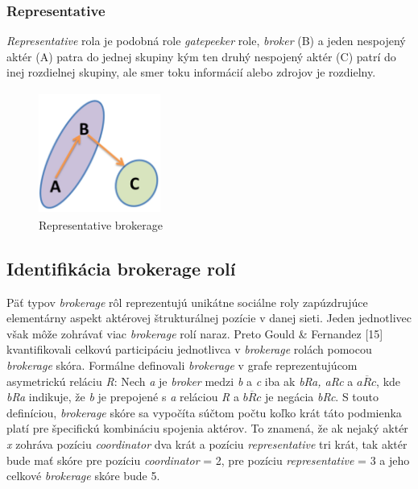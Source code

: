 \documentclass[slovak,master,public,dept460,male,cpdeclaration,oneside]{diploma}
\begin{document}
\subsubsection{Representative}
\textit{Representative} rola je podobná role \textit{gatepeeker} role, \textit{broker} (B) a jeden nespojený aktér (A) patra do jednej skupiny kým ten druhý nespojený aktér (C) patrí do inej rozdielnej skupiny, ale  smer toku informácií alebo zdrojov je rozdielny. 


\begin{figure}[H]
\centering
\includegraphics[width=4cm, height=4cm]{figures/representative}
\caption{Representative brokerage}
\end{figure}

\subsection{Identifikácia brokerage rolí}
Päť typov \textit{brokerage} rôl  reprezentujú unikátne sociálne roly zapúzdrujúce elementárny aspekt aktérovej štrukturálnej pozície v danej sieti. Jeden jednotlivec však môže zohrávať viac \textit{brokerage} rolí naraz. Preto Gould \& Fernandez [15] kvantifikovali celkovú participáciu jednotlivca v \textit{brokerage} rolách pomocou \textit{brokerage} skóra. Formálne definovali \textit{brokerage} v grafe reprezentujúcom asymetrickú reláciu \textit{R}: Nech \textit{a} je \textit{broker} medzi \textit{b} a \textit{c} iba ak \textit{bRa, aRc} a   ${ a\overline{R}c }$, kde \textit{bRa} indikuje, že \textit{b} je prepojené s \textit{a} reláciou \textit{R} a ${ b\overline{R}c }$
je negácia \textit{bRc}. S touto definíciou, \textit{brokerage} skóre sa vypočíta súčtom počtu koľko krát táto podmienka platí pre špecifickú kombináciu spojenia aktérov. To znamená, že ak nejaký aktér \textit{x} zohráva pozíciu \textit{coordinator} dva krát a pozíciu \textit{representative} tri krát, tak aktér bude mať skóre pre pozíciu \textit{coordinator} = 2, pre pozíciu  \textit{representative} = 3 a jeho celkové \textit{brokerage} skóre bude 5.
\end{document}
